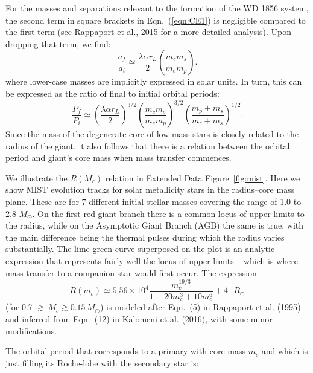 \documentclass{nature3}
\begin{document}
\begin{methods}
For the masses and separations relevant to the formation of the WD 1856 system, the second term in square brackets in Eqn.~(\ref{eqn:CE1}) is negligible compared to the first term (see Rappaport et al., 2015\cite{rappaport15} for a more detailed analysis).  Upon dropping that term, we find:
\begin{equation}
\frac{a_f}{a_i} \simeq \frac{\lambda \alpha r_L}{2} \left(\frac{m_c m_s}{m_e m_p}\right).
\label{eqn:CE2}
\end{equation}
where lower-case masses are implicitly expressed in solar units. In turn, this can be expressed as the ratio of final to initial orbital periods:
\begin{equation}
\frac{P_f}{P_i} \simeq \left(\frac{\lambda \alpha r_L}{2}\right)^{3/2} \left(\frac{m_c m_s}{m_e m_p}\right)^{3/2} \left(\frac{m_p+m_s}{m_c+m_s}\right)^{1/2}.
\label{eqn:CE3}
\end{equation}
Since the mass of the degenerate core of low-mass stars is closely related to the radius of the giant, it also follows that there is a relation between the orbital period and giant's core mass when mass transfer commences.  

We illustrate the $R(M_c)$ relation in Extended Data Figure~\ref{fig:mist}.  Here we show {MIST}\cite{mist} evolution tracks for solar metallicity stars in the radius--core mass plane. These are for 7 different initial stellar masses covering the range of 1.0 to 2.8 $M_\odot$. On the first red giant branch there is a common locus of upper limits to the radius, while on the Asymptotic Giant Branch (AGB) the same is true, with the main difference being the thermal pulses during which the radius varies substantially.  The lime green curve superposed on the plot is an analytic expression that represents fairly well the locus of upper limits -- which is where mass transfer to a companion star would first occur.  The expression 
\begin{equation}
R(m_c) \simeq 5.56 \times 10^4 \frac{m_c^{19/3}}{1+20 m_c^3+10  m_c^6} + 4 ~~~R_\odot
\label{eqn:r(mc)}
\end{equation}
(for 0.7 $\gtrsim \, M_c \gtrsim 0.15 \, M_\odot$) is modeled after Eqn.~(5) in Rappaport et al. (1995\cite{rappaport95}) and inferred from Eqn.~(12) in Kalomeni et al. (2016\cite{kalomeni16}), with some minor modifications.


The orbital period that corresponds to a primary with core mass $m_c$ and which is just filling its Roche-lobe with the secondary star is:


\end{methods}
\end{document}

